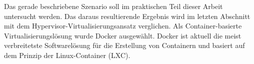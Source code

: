 Das gerade beschriebene Szenario soll im praktischen Teil dieser Arbeit untersucht werden. Das daraus resultierende Ergebnis wird im letzten Abschnitt mit dem Hypervisor-Virtualisierungsansatz verglichen. Als Container-basierte Virtualisierungslösung wurde Docker ausgewählt. Docker ist aktuell die meist verbreitetste Softwarelösung für die Erstellung von Containern und basiert auf dem Prinzip der Linux-Container (LXC).





